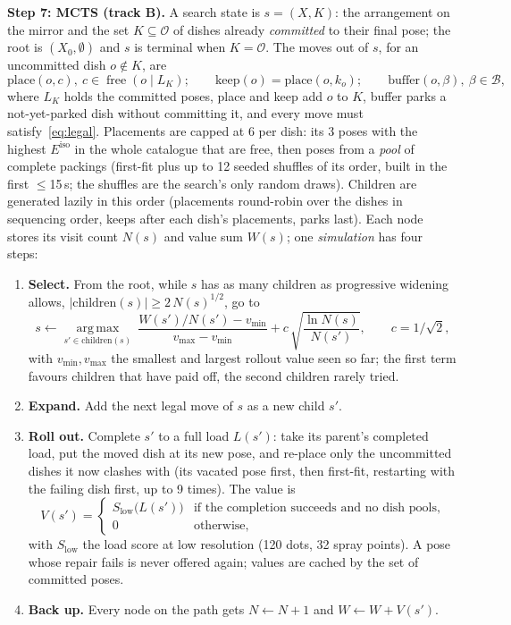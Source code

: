 \documentclass[10pt]{article}
\newcommand{\Obj}{\mathcal{O}}
\newcommand{\Buf}{\mathcal{B}}
\newcommand{\free}{\operatorname{free}}
\newcommand{\Slow}{S_{\mathrm{low}}}
\newcommand{\head}[1]{\par\smallskip\textbf{#1}\quad}
\begin{document}
\head{Step 7: MCTS (track B).}
A search state is $s=(X,K)$: the arrangement on the mirror and the set $K\subseteq\Obj$ of dishes already \emph{committed} to their final pose; the root is $(X_0,\emptyset)$ and $s$ is terminal when $K=\Obj$.
The moves out of $s$, for an uncommitted dish $o\notin K$, are
\begin{equation}
\text{place}(o,c),\ c\in\free(o\mid L_K);\qquad \text{keep}(o)=\text{place}(o,k_o);\qquad \text{buffer}(o,\beta),\ \beta\in\Buf,
\end{equation}
where $L_K$ holds the committed poses, place and keep add $o$ to $K$, buffer parks a not-yet-parked dish without committing it, and every move must satisfy~\eqref{eq:legal}.
Placements are capped at 6 per dish: its 3 poses with the highest $E^{\mathrm{iso}}$ in the whole catalogue that are free, then poses from a \emph{pool} of complete packings (first-fit plus up to 12 seeded shuffles of its order, built in the first $\le$15\,s; the shuffles are the search's only random draws).
Children are generated lazily in this order (placements round-robin over the dishes in sequencing order, keeps after each dish's placements, parks last).
Each node stores its visit count $N(s)$ and value sum $W(s)$; one \emph{simulation} has four steps:
\begin{enumerate}
\item \textbf{Select.} From the root, while $s$ has as many children as progressive widening allows, $|\text{children}(s)|\ge 2\,N(s)^{1/2}$, go to
\begin{equation}
s\leftarrow\operatorname*{arg\,max}_{s'\in\text{children}(s)}\ \frac{W(s')/N(s')-v_{\min}}{v_{\max}-v_{\min}}+c\,\sqrt{\frac{\ln N(s)}{N(s')}},\qquad c=1/\sqrt2,
\label{eq:uct}
\end{equation}
with $v_{\min},v_{\max}$ the smallest and largest rollout value seen so far; the first term favours children that have paid off, the second children rarely tried.
\item \textbf{Expand.} Add the next legal move of $s$ as a new child $s'$.
\item \textbf{Roll out.} Complete $s'$ to a full load $L(s')$: take its parent's completed load, put the moved dish at its new pose, and re-place only the uncommitted dishes it now clashes with (its vacated pose first, then first-fit, restarting with the failing dish first, up to 9 times). The value is
\begin{equation}
V(s')=\begin{cases}\Slow\bigl(L(s')\bigr)&\text{if the completion succeeds and no dish pools},\\ 0&\text{otherwise,}\end{cases}
\end{equation}
with $\Slow$ the load score at low resolution (120 dots, 32 spray points). A pose whose repair fails is never offered again; values are cached by the set of committed poses.
\item \textbf{Back up.} Every node on the path gets $N\leftarrow N+1$ and $W\leftarrow W+V(s')$.
\end{enumerate}
\end{document}

